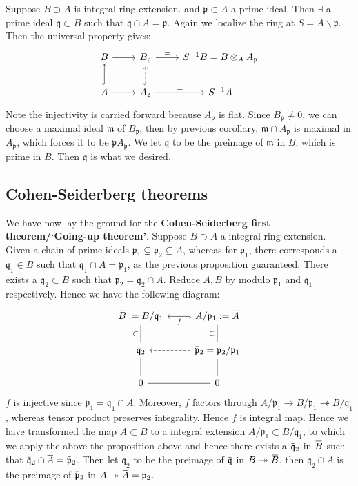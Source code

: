 \documentclass[12pt]{article}
\theoremstyle{definition}
\theoremstyle{plain}
\newcommand{\surj}{\twoheadrightarrow}
\newcommand{\overbar}[1]{\mkern 1.5mu\overline{\mkern-1.5mu#1\mkern-1.5mu}\mkern 1.5mu}
\renewcommand{\bar}{\overbar}
\begin{document}
\Prop Suppose $B\supset A$ is integral ring extension. and $\mathfrak{p}\subset A$ a prime ideal. Then $\exists$ a prime ideal $\mathfrak{q}\subset B$ such that $\mathfrak{q}\cap A=\mathfrak{p}$.
\proof Again we localize the ring at $S=A\backslash \mathfrak{p}$. Then the universal property gives:
\begin{equation}
  \begin{tikzcd}
    B\ar{r}& B_\mathfrak{p}\ar{r}{=}&S^{-1}B=B\otimes_A A_\mathfrak{p}\\
    A\ar[hook]{u}\ar{r}&A_\mathfrak{p}\ar[hook, dashed]{u}\ar{r}{=}&S^{-1}A
  \end{tikzcd}
\end{equation}
Note the injectivity is carried forward because $A_\mathfrak{p}$ is flat. Since $B_\mathfrak{p}\neq 0$, we can choose a maximal ideal $\mathfrak{m}$ of $B_\mathfrak{p}$, then by previous corollary, $\mathfrak{m}\cap A_\mathfrak{p}$ is maximal in $A_\mathfrak{p}$, which forces it to be $\mathfrak{p}A_\mathfrak{p}$. We let $\mathfrak{q}$ to be the preimage of $\mathfrak{m}$ in $B$, which is prime in $B$. Then $\mathfrak{q}$ is what we desired. \qedhere


\subsection{Cohen-Seiderberg theorems}
We have now lay the ground for the \textbf{Cohen-Seiderberg first theorem/`Going-up theorem'}. Suppose $B\supset A$ a integral ring extension. Given a chain of prime ideals $\mathfrak{p}_1\subsetneq \mathfrak{p}_2\subseteq A$, whereas for $\mathfrak{p}_1$, there corresponds a $\mathfrak{q}_1\in B$ such that $\mathfrak{q}_1\cap A=\mathfrak{p}_1$, as the previous proposition guaranteed.
 There exists a $\mathfrak{q}_2\subset B$ such that $\mathfrak{p}_2=\mathfrak{q}_2\cap A$.
\proof Reduce $A, B$ by modulo $\mathfrak{p}_1$ and $\mathfrak{q}_1$ respectively. Hence we have the following diagram:
\begin{equation}
  \begin{tikzcd}
    \bar{B}:=B/\mathfrak{q}_1&A/\mathfrak{p}_1\ar[hook]{l}{f}:=\bar{A}\\
    \bar{\mathfrak{q}}_2\ar[-]{u}{\subset}&\bar{\mathfrak{p}}_2=\mathfrak{p}_2/\mathfrak{p}_1\ar[-]{u}{\subset}\ar[dashed]{l}\\
    0\ar[-]{u}\ar[-]{r}&0\ar[-]{u}
  \end{tikzcd}
\end{equation}
$f$ is injective since $\mathfrak{p}_1=\mathfrak{q}_1\cap A$. Moreover, $f$ factors through $A/\mathfrak{p}_1\to B/\mathfrak{p}_1 \surj B/\mathfrak{q}_1$, whereas tensor product preserves integrality. Hence $f$ is integral map. Hence we have transformed the map $A\subset B$ to a integral extension $A/\mathfrak{p}_1\subset B/\mathfrak{q}_1$, to which we apply the above the proposition above and hence there exists a $\bar{\mathfrak{q}}_2$ in $\bar{B}$ such that $\bar{\mathfrak{q}}_2\cap \bar{A}=\bar{\mathfrak{p}}_2$. Then let $\mathfrak{q}_2$ to be the preimage of $\bar{\mathfrak{q}}$ in $B\surj \bar{B}$, then $\mathfrak{q}_2\cap A$ is the preimage of $\bar{\mathfrak{p}}_2$ in $A\surj \bar{A}=\mathfrak{p}_2$.\qedhere
\end{document}
